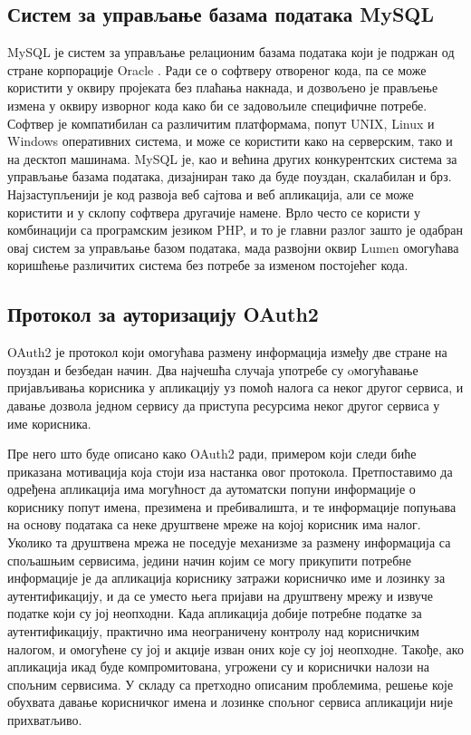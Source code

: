 \documentclass[12pt,oneside]{memoir}
\begin{document}
\subsection{Систем за управљање базама података MySQL}
MySQL је систем за управљање релационим базама података који је подржан од стране корпорације Oracle \cite{oracle}. Ради се о софтверу отвореног кода, па се може користити у оквиру пројеката без плаћања накнада, и дозвољено је прављење измена у оквиру изворног кода како би се задовољиле специфичне потребе. Софтвер је компатибилан са различитим платформама, попут UNIX, Linux и Windows оперативних система, и може се користити како на серверским, тако и на десктоп машинама. MySQL је, као и већина других конкурентских система за управљање базама података, дизајниран тако да буде поуздан, скалабилан и брз. Најзаступљенији је код развоја веб сајтова и веб апликација, али се може користити и у склопу софтвера другачије намене. Врло често се користи у комбинацији са програмским језиком PHP, и то је главни разлог зашто је одабран овај систем за управљање базом података, мада развојни оквир Lumen омогућава коришћење различитих система без потребе за изменом постојећег кода.

\subsection{Протокол за ауторизацију OAuth2}
OAuth2 је протокол који омогућава размену информација између две стране на поуздан и безбедан начин. Два најчешћа случаја употребе су oмогућавање пријављивања корисника у апликацију уз помоћ налога са неког другог сервиса, и давање дозвола једном сервису да приступа ресурсима неког другог сервиса у име корисника.

Пре него што буде описано како OAuth2 ради, примером који следи биће приказана мотивација која стоји иза настанка овог протокола. Претпоставимо да одређена апликација има могућност да аутоматски попуни информације о кориснику попут имена, презимена и пребивалишта, и те информације попуњава на основу података са неке друштвене мреже на којој корисник има налог. Уколико та друштвена мрежа не поседује механизме за размену информација са спољашњим сервисима, једини начин којим се могу прикупити потребне информације је да апликација кориснику затражи корисничко име и лозинку за аутентификацију, и да се уместо њега пријави на друштвену мрежу и извуче податке који су јој неопходни. Када апликација добије потребне податке за аутентификацију, практично има неограничену контролу над корисничким налогом, и омогућене су јој и акције изван оних које су јој неопходне. Такође, ако апликација икад буде компромитована, угрожени су и кориснички налози на спољним сервисима. У складу са претходно описаним проблемима, решење које обухвата давање корисничког имена и лозинке спољног сервиса апликацији није прихватљиво.
\end{document}
